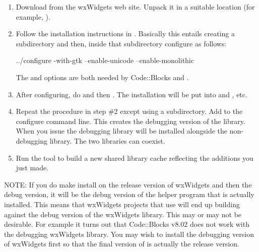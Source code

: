 \begin{enumerate}

\item Download  from the wxWidgets web site. Unpack it in a suitable location (for example, ).

\item Follow the installation instructions in . Basically this entails creating a  subdirectory and then, inside that subdirectory configure as follows:

\begin{commands}
../configure -with-gtk --enable-unicode --enable-monolithic
\end{commands}

The  and  options are both needed by Code::Blocks and \MapEditor.

\item After configuring, do  and then . The installation will be put into  and , etc.

\item Repeat the procedure in step \#2 except using a  subdirectory. Add  to the configure command line. This creates the debugging version of the library. When you issue  the debugging library will be installed alongside the non-debugging library. The two libraries can coexist.

\item Run the  tool to build a new shared library cache reflecting the additions you just made.

\end{enumerate}

NOTE: If you do make install on the release version of wxWidgets and then the debug version, it will be the debug version of the  helper program that is actually installed. This means that wxWidgets projects that use  will end up building against the debug version of the wxWidgets library. This may or may not be desirable. For example it turns out that Code::Blocks v8.02 does not work with the debugging wxWidgets library. You may wish to install the debugging version of wxWidgets first so that the final version of  is actually the release version.

